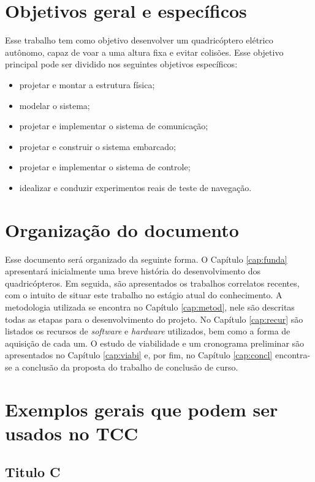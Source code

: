 \section{Objetivos geral e específicos}

Esse trabalho tem como objetivo desenvolver um quadricóptero elétrico autônomo, capaz de voar a uma altura fixa e evitar colisões. Esse objetivo principal pode ser dividido nos seguintes objetivos específicos:

\begin{itemize}
\item projetar e montar a estrutura física;
\item modelar o sistema;
\item projetar e implementar o sistema de comunicação;
\item projetar e construir o sistema embarcado;
\item projetar e implementar o sistema de controle;
\item idealizar e conduzir experimentos reais de teste de navegação.
\end{itemize}


\section{Organização do documento}

Esse documento será organizado da seguinte forma. O Capítulo \ref{cap:funda} apresentará inicialmente uma breve história do desenvolvimento dos quadricópteros. Em seguida, são apresentados os trabalhos correlatos recentes, com o intuito de situar este trabalho no estágio atual do conhecimento. A metodologia utilizada se encontra no Capítulo \ref{cap:metod}, nele são descritas todas as etapas para o desenvolvimento do projeto. No Capítulo \ref{cap:recur} são listados os recursos de \textit{software} e \textit{hardware} utilizados, bem como a forma de aquisição de cada um. O estudo de viabilidade e um cronograma preliminar são apresentados no Capítulo \ref{cap:viabi} e, por fim, no Capítulo \ref{cap:concl} encontra-se a conclusão da proposta do trabalho de conclusão de curso.

\section{Exemplos gerais que podem ser usados no TCC}\label{subsec:ExemplosLatex}



\subsection{Titulo C}\label{ssubsec:tituloc}

